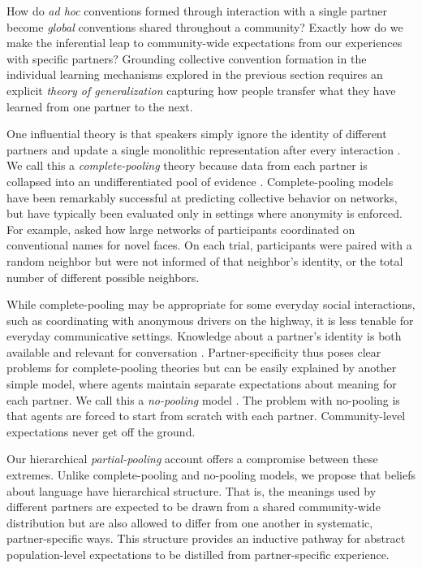 
How do \emph{ad hoc} conventions formed through interaction with a single partner become \emph{global} conventions shared throughout a community?
Exactly how do we make the inferential leap to community-wide expectations from our experiences with specific partners? 
Grounding collective convention formation in the individual learning mechanisms explored in the previous section requires an explicit \emph{theory of generalization} capturing how people transfer what they have learned from one partner to the next.

One influential theory is that speakers simply ignore the identity of different partners and update a single monolithic representation after every interaction \cite{steels_self-organizing_1995,barr_establishing_2004,young_evolution_2015}.
We call this a \emph{complete-pooling} theory because data from each partner is collapsed into an undifferentiated pool of evidence \cite{gelman2006data}. 
Complete-pooling models have been remarkably successful at predicting collective behavior on networks, but have typically been evaluated only in settings where anonymity is enforced. 
For example,  asked how large networks of participants coordinated on conventional names for novel faces.
On each trial, participants were paired with a random neighbor but were not informed of that neighbor's identity, or the total number of different possible neighbors. 

While complete-pooling may be appropriate for some everyday social interactions, such as coordinating with anonymous drivers on the highway, it is less tenable for everyday communicative settings.
Knowledge about a partner's identity is both available and relevant for conversation \cite{eckert_three_2012, davidson_nice_1986}.
Partner-specificity thus poses clear problems for complete-pooling theories but can be easily explained by another simple model, where agents maintain separate expectations about meaning for each partner.
We call this a \emph{no-pooling} model \cite<note that this no-pooling model was compared with a complete-pooling model in>{SmithEtAl17_LanguageLearning}.
The problem with no-pooling is that agents are forced to start from scratch with each partner.
Community-level expectations never get off the ground.

Our hierarchical \emph{partial-pooling} account offers a compromise between these extremes.
Unlike complete-pooling and no-pooling models, we propose that beliefs about language have hierarchical structure.
That is, the meanings used by different partners are expected to be drawn from a shared community-wide distribution but are also allowed to differ from one another in systematic, partner-specific ways.
This structure provides an inductive pathway for abstract population-level expectations to be distilled from partner-specific experience.

